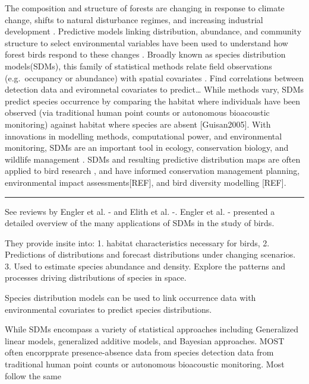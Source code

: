 \documentclass[preprint, 3p,
authoryear]{elsarticle} %
\begin{document}
The composition and structure of forests are changing in response to
climate change, shifts to natural disturbance regimes, and increasing
industrial development \citep{Brandt2013}. Predictive models linking
distribution, abundance, and community structure to select environmental
variables have been used to understand how forest birds respond to these
changes
\citep{Carrillo-Rubio2014, Engler2017a, guisanPredictiveHabitatDistribution2000, He2015}.
Broadly known as species distribution models(SDMs), this family of
statistical methods relate field observations (e.g.~occupancy or
abundance) with spatial covariates \citep{Guisan2005}. Find correlations
between detection data and eviromnetal covariates to predict\ldots{}
While methods vary, SDMs predict species occurrence by comparing the
habitat where individuals have been observed (via traditional human
point counts or autonomous bioacoustic monitoring) against habitat where
species are absent {[}Guisan2005{]}. With innovations in modelling
methods, computational power, and environmental monitoring, SDMs are an
important tool in ecology, conservation biology, and wildlife management
\citep{Elith2009}. SDMs and resulting predictive distribution maps are
often applied to bird research \citet{englerAvianSDMsCurrent2017}, and
have informed conservation management planning, environmental impact
assessments{[}REF{]}, and bird diversity modelling
{[}REF{]}\citep{englerAvianSDMsCurrent2017, franklinMappingSpeciesDistributions2010}.

\begin{center}\rule{0.5\linewidth}{0.5pt}\end{center}

See reviews by Engler et al. -\citet{englerAvianSDMsCurrent2017} and
Elith et al. -\citet{Elith2009}. Engler et al.
-\citet{englerAvianSDMsCurrent2017} presented a detailed overview of the
many applications of SDMs in the study of birds.

They provide insite into: 1. habitat characteristics necessary for
birds, 2. Predictions of distributions and forecast distributions under
changing scenarios. 3. Used to estimate species abundance and density.
Explore the patterns and processes driving distributions of species in
space.

Species distribution models can be used to link occurrence data with
environmental covariates to predict species distributions.

While SDMs encompass a variety of statistical approaches including
Generalized linear models, generalized additive models, and Bayesian
approaches. MOST often encorpprate presence-absence data from species
detection data from traditional human point counts or autonomous
bioacoustic monitoring. Most follow the same
\end{document}
